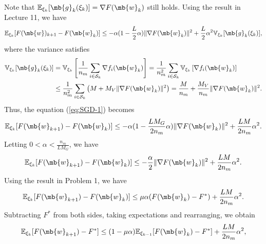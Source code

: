 \begin{exercise}
\begin{enumerate}
            \begin{solution}
                Note that $\mathbb{E}_{\xi_k}[\mb{g}_k(\xi_k)] = \nabla F(\mb{w}_k)$ still holds. Using the result in Lecture 11, we have
                \begin{align*}
                    \mathbb{E}_{\xi_k}[F(\mb{w})_{k+1}-F(\mb{w}_k)] \le -\alpha(1-\frac{L}{2}\alpha)\|\nabla F(\mb{w}_k)\|^2 + \frac{L}{2}\alpha^2 \mathbb{V}_{\xi_k}[\mb{g}_k(\xi_k)],
                \end{align*}
                where the variance satisfies
                \begin{align*}
                    \mathbb{V}_{\xi_k}[\mb{g}_k(\xi_k)] & = \mathbb{V}_{\xi_k}\left[\frac{1}{n_m}\sum_{i\in\mathcal{S}_k} \nabla f_{i}(\mb{w}_k)\right]   = \frac{1}{n_m^2}\sum_{i\in\mathcal{S}_k}\mathbb{V}_{\xi_k}\left[ \nabla f_{i}(\mb{w}_k)\right] \\
                                                        & \le \frac{1}{n_m^2}\sum_{i\in\mathcal{S}_k}\left(M + M_V\|\nabla F(\mb{w}_k)\|^2\right)  = \frac{M}{n_m} + \frac{M_V}{n_m}\|\nabla F(\mb{w}_k)\|^2.
                \end{align*}
                Thus, the equation (\ref{eq:SGD-1}) becomes
                \begin{align*}
                    \mathbb{E}_{\xi_{k}}[F(\mb{w}_{k+1})-F(\mb{w}_k)] \leq -\alpha(1-\frac{LM_G}{2n_m}\alpha)\|\nabla F(\mb{w}_k)\|^2 + \frac{LM}{2n_m}\alpha^2.
                \end{align*}
                Letting $0 < \alpha < \frac{n_m}{LM_G}$, we have
                \begin{align*}
                    \mathbb{E}_{\xi_{k}}[F(\mb{w}_{k+1})-F(\mb{w}_k)] \leq -\frac{\alpha}{2}\|\nabla F(\mb{w}_k)\|^2 + \frac{LM}{2n_m}\alpha^2.
                \end{align*}
                Using the result in Problem 1, we have
                \begin{align*}
                    \mathbb{E}_{\xi_{k}}[F(\mb{w}_{k+1})-F(\mb{w}_k)] \leq \mu\alpha(F(\mb{w}_k)-F^*) + \frac{LM}{2n_m}\alpha^2.
                \end{align*}
                Subtracting $F^*$ from both sides, taking expectations and rearranging, we obtain
                \begin{align*}
                    \mathbb{E}_{\xi_{k}}[F(\mb{w}_{k+1})-F^*] \leq (1-\mu\alpha)\mathbb{E}_{\xi_{k-1}}[F(\mb{w}_k)-F^*] + \frac{LM}{2n_m}\alpha^2,
                \end{align*}

\end{solution}
\end{enumerate}
\end{exercise}
